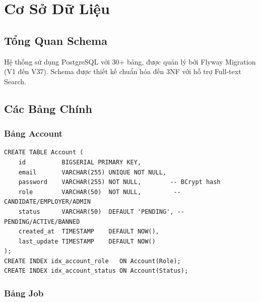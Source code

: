 \documentclass[12pt, a4paper]{report}
\begin{document}
\chapter{Cơ Sở Dữ Liệu}

\section{Tổng Quan Schema}

Hệ thống sử dụng PostgreSQL với 30+ bảng, được quản lý bởi Flyway Migration (V1 đến V37). Schema được thiết kế chuẩn hóa đến 3NF với hỗ trợ Full-text Search.

\section{Các Bảng Chính}

\subsection{Bảng Account}

\begin{lstlisting}[style=sqlstyle]
CREATE TABLE Account (
    id          BIGSERIAL PRIMARY KEY,
    email       VARCHAR(255) UNIQUE NOT NULL,
    password    VARCHAR(255) NOT NULL,        -- BCrypt hash
    role        VARCHAR(50)  NOT NULL,         -- CANDIDATE/EMPLOYER/ADMIN
    status      VARCHAR(50)  DEFAULT 'PENDING', -- PENDING/ACTIVE/BANNED
    created_at  TIMESTAMP    DEFAULT NOW(),
    last_update TIMESTAMP    DEFAULT NOW()
);
CREATE INDEX idx_account_role   ON Account(Role);
CREATE INDEX idx_account_status ON Account(Status);
\end{lstlisting}

\subsection{Bảng Job}
\end{document}
